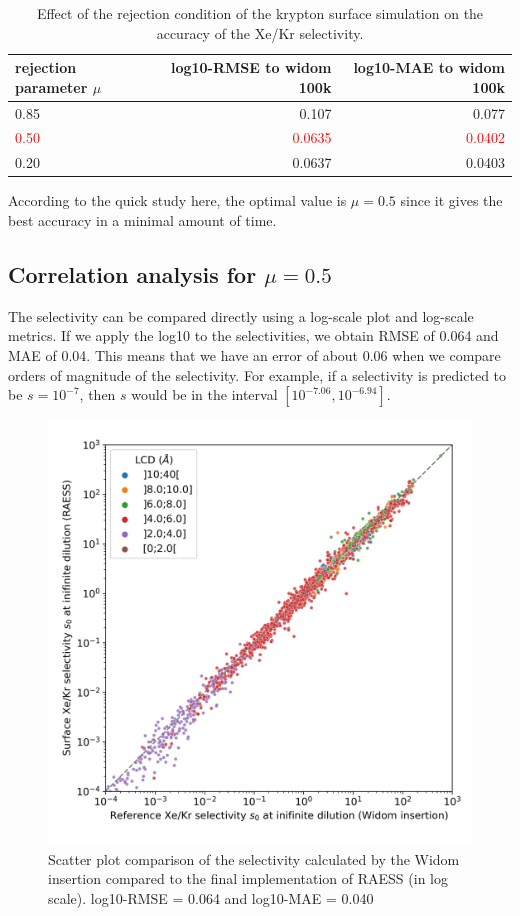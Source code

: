 \documentclass[main]{subfiles}
\begin{document}
\begin{table}[ht]
\begin{tabular}{|l|r|r|}
\hline
  rejection parameter $\mu$ &  log10-RMSE to widom 100k &   log10-MAE to widom 100k \\
\hline
    0.85 &      0.107 &   0.077 \\
    \textcolor{red}{0.50} &      \textcolor{red}{0.0635} &   \textcolor{red}{0.0402} \\
    0.20 &      0.0637 &   0.0403 \\
\hline
\end{tabular}
\caption{Effect of the rejection condition of the krypton surface simulation on the accuracy of the Xe/Kr selectivity. }
\end{table}

According to the quick study here, the optimal value is $\mu=0.5$ since it gives the best accuracy in a minimal amount of time. 

\subsection{Correlation analysis for $\mu=0.5$}

The selectivity can be compared directly using a log-scale plot and log-scale metrics. If we apply the log10 to the selectivities, we obtain RMSE of 0.064 and MAE of 0.04. This means that we have an error of about 0.06 when we compare orders of magnitude of the selectivity. For example, if a selectivity is predicted to be $s = 10^{-7}$, then $s$ would be in the interval $[10^{-7.06},10^{-6.94}]$.

\begin{figure}[ht]
\centering
  \includegraphics[width=0.5\linewidth]{figures/3-fastsim/s_0_widom_vs_s_0_surface_zoom.jpg}
  \caption{Scatter plot comparison of the selectivity calculated by the Widom insertion compared to the final implementation of RAESS (in log scale). log10-RMSE = 0.064 and log10-MAE = 0.040}
  \label{fgr:s_0}
\end{figure}
\end{document}
